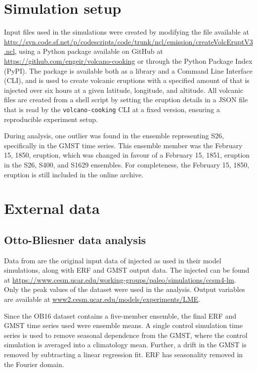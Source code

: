 \documentclass[draft]{agujournal2019}
\begin{document}
  \appendix

  \section{Simulation setup}

  Input files used in the simulations were created by modifying the file available at \url{http://svn.code.sf.net/p/codescripts/code/trunk/ncl/emission/createVolcEruptV3.ncl},
  using a Python package available on GitHub at
  \url{https://github.com/engeir/volcano-cooking} or through the Python Package Index
  (PyPI). The package is available both as a library and a Command Line Interface (CLI),
  and is used to create volcanic eruptions with a specified amount of  that is
  injected over six hours at a given latitude, longitude, and altitude. All volcanic
   files are created from a shell script by setting the eruption details in a
  JSON file that is read by the \texttt{volcano-cooking} CLI at a fixed version,
  ensuring a reproducible experiment setup.

  During analysis, one outlier was found in the ensemble representing S26, specifically
  in the GMST time series. This ensemble member was the February 15, 1850, eruption,
  which was changed in favour of a February 15, 1851, eruption in the S26, S400, and
  S1629 ensembles. For completeness, the February 15, 1850, eruption is still included
  in the online archive.

  \section{External data}

  \subsection{Otto-Bliesner data analysis}

  \label{ap:ob16}

  Data from  are the original input data of injected  as
  used in their model simulations, along with ERF and GMST output data. The injected
   can be found at
  \url{https://www.cesm.ucar.edu/working-groups/paleo/simulations/ccsm4-lm}. Only the
  peak values of the  dataset were used in the analysis. Output variables are
  available at \url{www2.cesm.ucar.edu/models/experiments/LME}.

  Since the OB16 dataset contains a five-member ensemble, the final ERF and GMST time
  series used were ensemble means. A single control simulation time series is used to
  remove seasonal dependence from the GMST, where the control simulation is averaged
  into a climatology mean. Further, a drift in the GMST is removed by subtracting a
  linear regression fit. ERF has seasonality removed in the Fourier domain.
\end{document}
